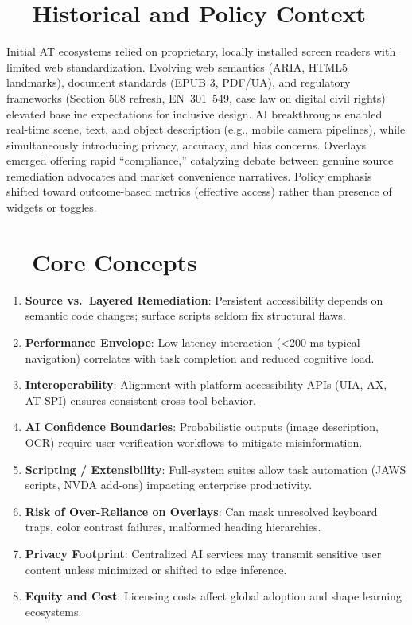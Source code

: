 \section{~~Historical and Policy Context}
\label{sec:ch28-history}
Initial AT ecosystems relied on proprietary, locally installed screen readers with limited web standardization. Evolving web semantics (ARIA, HTML5 landmarks), document standards (EPUB 3, PDF/UA), and regulatory frameworks (Section 508 refresh, EN~301~549, case law on digital civil rights) elevated baseline expectations for inclusive design. AI breakthroughs enabled real-time scene, text, and object description (e.g., mobile camera pipelines), while simultaneously introducing privacy, accuracy, and bias concerns\supercite{Kim2023, Brown2022, DataPrivacyAI}. Overlays emerged offering rapid “compliance,” catalyzing debate between genuine source remediation advocates and market convenience narratives\supercite{AccessiBe2024, UserWay2024}. Policy emphasis shifted toward outcome-based metrics (effective access) rather than presence of widgets or toggles\supercite{Jaeger2006, Lazar2015}.

\section{~~Core Concepts}
\label{sec:ch28-core-concepts}
\begin{enumerate}
	\item \textbf{Source vs.\ Layered Remediation}: Persistent accessibility depends on semantic code changes; surface scripts seldom fix structural flaws.
	\item \textbf{Performance Envelope}: Low-latency interaction (<200 ms typical navigation) correlates with task completion and reduced cognitive load\supercite{Fowler2011ScreenReaderLatency}.
	\item \textbf{Interoperability}: Alignment with platform accessibility APIs (UIA, AX, AT-SPI) ensures consistent cross-tool behavior.
	\item \textbf{AI Confidence Boundaries}: Probabilistic outputs (image description, OCR) require user verification workflows to mitigate misinformation.
	\item \textbf{Scripting / Extensibility}: Full-system suites allow task automation (JAWS scripts, NVDA add-ons) impacting enterprise productivity.
	\item \textbf{Risk of Over-Reliance on Overlays}: Can mask unresolved keyboard traps, color contrast failures, malformed heading hierarchies.
	\item \textbf{Privacy Footprint}: Centralized AI services may transmit sensitive user content unless minimized or shifted to edge inference.
	\item \textbf{Equity and Cost}: Licensing costs affect global adoption and shape learning ecosystems\supercite{Lee2019}.
\end{enumerate}

